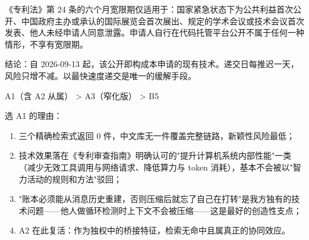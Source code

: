 \documentclass[11pt,UTF8]{ctexart}
\begin{document}
《专利法》第 24 条的六个月宽限期{\ntbf 仅}适用于：国家紧急状态下为公共利益首次公开、中国政府主办或承认的国际展览会首次展出、规定的学术会议或技术会议首次发表、他人未经申请人同意泄露。{\ntbf 申请人自行在代码托管平台公开不属于任何一种情形，不享有宽限期。}

{\ntbf 结论}：自 2026-09-13 起，该公开即构成本申请的现有技术。递交日每推迟一天，风险只增不减。{\ntbf 以最快速度递交是唯一的缓解手段。}


{\ntbf A1（含 A2 从属） > A3（窄化版） > B5}

选 A1 的理由：

\begin{enumerate}
  \item 三个精确检索式返回 0 件，中文库无一件覆盖完整链路，新颖性风险最低；
  \item 技术效果落在《专利审查指南》明确认可的"提升计算机系统内部性能"一类（减少无效工具调用与网络请求、降低算力与 token 消耗），基本不会被以"智力活动的规则和方法"驳回；
  \item "账本必须能从消息历史重建，否则压缩后就忘了自己在打转"是我方独有的技术问题——他人做循环检测时上下文不会被压缩——这是最好的创造性支点；
  \item A2 在此复活：作为独权中的桥接特征，检索无命中且属真正的协同效应。
\end{enumerate}
\end{document}
